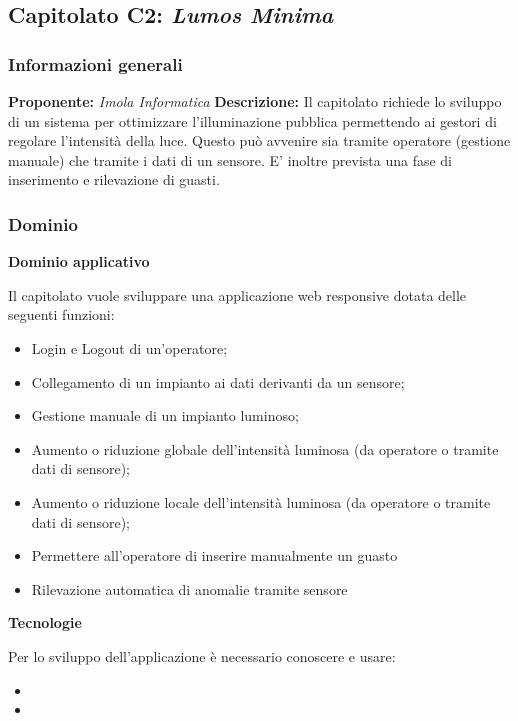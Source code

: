 \subsection{Capitolato C2: \textit{Lumos Minima}}
\subsubsection{Informazioni generali}
\textbf{Proponente:} \textit{Imola Informatica}
\textbf{Descrizione:}
Il capitolato richiede lo sviluppo di un sistema per ottimizzare l'illuminazione pubblica permettendo ai gestori di regolare l'intensità della luce. Questo può avvenire sia tramite operatore (gestione manuale)
che tramite i dati di un sensore. E' inoltre prevista una fase di inserimento e rilevazione di guasti.

\subsubsection{Dominio}

\textbf{Dominio applicativo}

Il capitolato vuole sviluppare una applicazione web responsive dotata delle seguenti funzioni:
\begin{itemize}
    \item Login e Logout di un'operatore;
    \item Collegamento di un impianto ai dati derivanti da un sensore;
    \item Gestione manuale di un impianto luminoso;
    \item Aumento o riduzione globale dell'intensità luminosa (da operatore o tramite dati di sensore);
    \item Aumento o riduzione locale dell'intensità luminosa (da operatore o tramite dati di sensore);
    \item Permettere all'operatore di inserire manualmente un guasto
    \item Rilevazione automatica di anomalie tramite sensore
\end{itemize}

\textbf{Tecnologie}

Per lo sviluppo dell'applicazione è necessario conoscere e usare:
\begin{itemize}
    \item %
    \item %
\end{itemize}



